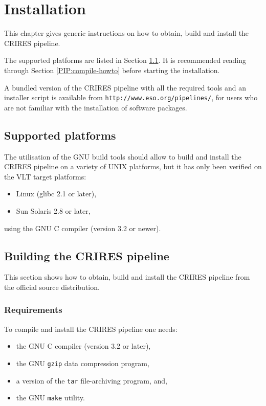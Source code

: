 \section{Installation}
\label{installation}

This chapter gives generic instructions on how to obtain, build and install
the CRIRES pipeline. 

The supported platforms are listed in Section \ref{PIP:platforms}. 
It is recommended reading through Section \ref{PIP:compile-howto} 
before starting the installation.

A bundled version of the CRIRES pipeline with all the required tools 
and an installer script is available from 
 \texttt{http://www.eso.org/pipelines/},  for users 
who are not familiar with the installation of software packages.

\subsection{Supported platforms}
\label{PIP:platforms}

The utilisation of the GNU build tools should allow to build and install
the CRIRES pipeline on a variety of UNIX platforms, but it has only been
verified on the VLT target platforms:
\begin{itemize}
  \item Linux (glibc 2.1 or later),
  \item Sun Solaris 2.8 or later,
\end{itemize}
using the GNU C compiler (version 3.2 or newer).

\subsection{Building the CRIRES pipeline}

This section shows how to obtain, build and install the CRIRES pipeline 
from the official source distribution.

\subsubsection{Requirements}
\label{PIP:requirements}

To compile and install the CRIRES pipeline one needs:
\begin{itemize}
  \item the GNU C compiler (version 3.2 or later),
  \item the GNU  \texttt{gzip}  data compression program,
  \item a version of the  \texttt{tar}  file-archiving program, and,
  \item the GNU  \texttt{make}  utility.
\end{itemize}


